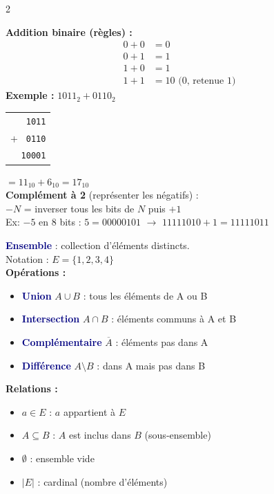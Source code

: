 \documentclass[a4paper,10pt]{article}
\newcommand{\key}[1]{\textbf{\textcolor{navy}{#1}}}
\begin{document}
\begin{multicols}{2}
\begin{tcolorbox}[basebox, colframe=orange, title=6. Arithmétique — Opérations en binaire]
\textbf{Addition binaire (règles) :}
\begin{align*}
0 + 0 &= 0 \\
0 + 1 &= 1 \\
1 + 0 &= 1 \\
1 + 1 &= 10 \text{ (0, retenue 1)}
\end{align*}
\textbf{Exemple :} $1011_2 + 0110_2$
\begin{center}
\begin{tabular}{r}
  \texttt{\ 1011} \\
+ \texttt{\ 0110} \\
\hline
  \texttt{10001} \\
\end{tabular}
\end{center}
$= 11_{10} + 6_{10} = 17_{10}$ \checkmark \\[4pt]
\textbf{Complément à 2} (représenter les négatifs) :\\
$-N$ = inverser tous les bits de $N$ puis $+1$ \\
Ex: $-5$ en 8 bits : $5=00000101$ $\to$ $11111010 + 1 = 11111011$
\end{tcolorbox}

\begin{tcolorbox}[basebox, colframe=navy, title=7. Théorie des Ensembles]
\key{Ensemble} : collection d'éléments distincts.\\
Notation : $E = \{1, 2, 3, 4\}$\\[4pt]
\textbf{Opérations :}
\begin{itemize}
  \item \key{Union} $A \cup B$ : tous les éléments de A ou B
  \item \key{Intersection} $A \cap B$ : éléments communs à A et B
  \item \key{Complémentaire} $\overline{A}$ : éléments pas dans A
  \item \key{Différence} $A \setminus B$ : dans A mais pas dans B
\end{itemize}
\vspace{4pt}
\textbf{Relations :}
\begin{itemize}
  \item $a \in E$ : $a$ appartient à $E$
  \item $A \subseteq B$ : $A$ est inclus dans $B$ (sous-ensemble)
  \item $\emptyset$ : ensemble vide
  \item $|E|$ : cardinal (nombre d'éléments)
\end{itemize}
\end{tcolorbox}


\end{multicols}
\end{document}
